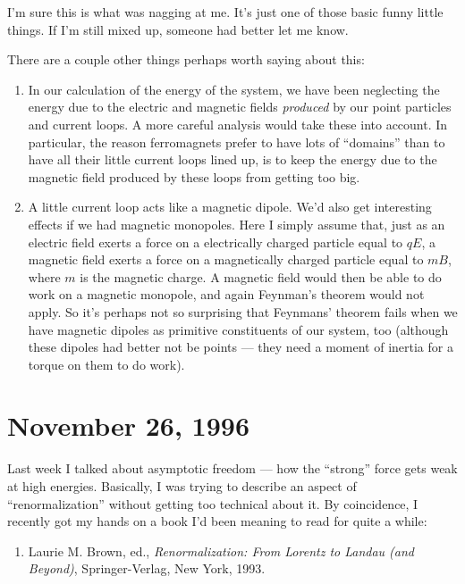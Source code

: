 \documentclass{article}
\def\tightlist{}
\begin{document}
I'm sure this is what was nagging at me. It's just one of those basic
funny little things. If I'm still mixed up, someone had better let me
know.

There are a couple other things perhaps worth saying about this:

\begin{enumerate}
\def\labelenumi{\arabic{enumi}.}
\tightlist
\item
  In our calculation of the energy of the system, we have been
  neglecting the energy due to the electric and magnetic fields
  \emph{produced} by our point particles and current loops. A more
  careful analysis would take these into account. In particular, the
  reason ferromagnets prefer to have lots of ``domains'' than to have
  all their little current loops lined up, is to keep the energy due to
  the magnetic field produced by these loops from getting too big.
\item
  A little current loop acts like a magnetic dipole. We'd also get
  interesting effects if we had magnetic monopoles. Here I simply assume
  that, just as an electric field exerts a force on a electrically
  charged particle equal to \(q E\), a magnetic field exerts a force on
  a magnetically charged particle equal to \(m B\), where \(m\) is the
  magnetic charge. A magnetic field would then be able to do work on a
  magnetic monopole, and again Feynman's theorem would not apply. So
  it's perhaps not so surprising that Feynmans' theorem fails when we
  have magnetic dipoles as primitive constituents of our system, too
  (although these dipoles had better not be points --- they need a
  moment of inertia for a torque on them to do work).
\end{enumerate}



\hypertarget{week95}{%
\section{November 26, 1996}\label{week95}}

Last week I talked about asymptotic freedom --- how the ``strong'' force
gets weak at high energies. Basically, I was trying to describe an
aspect of ``renormalization'' without getting too technical about it. By
coincidence, I recently got my hands on a book I'd been meaning to read
for quite a while:

\begin{enumerate}
\def\labelenumi{\arabic{enumi})}
\tightlist
\item
  Laurie M. Brown, ed., \emph{Renormalization: From Lorentz to Landau
  (and Beyond)}, Springer-Verlag, New York, 1993.
\end{enumerate}
\end{document}
